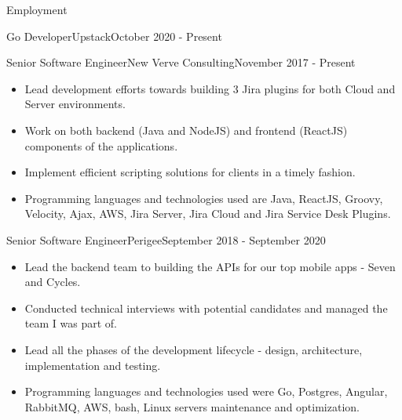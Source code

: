\documentclass[]{cv}
\begin{document}
	\makeheader
	
	\begin{cvsection}{Employment}
		\begin{cvsubsection}{Go Developer}{Upstack}{October 2020 - Present }
		\end{cvsubsection}

		\begin{cvsubsection}{Senior Software Engineer}{New Verve Consulting}{November 2017 - Present }
			\begin{itemize}
				\item Lead development efforts towards building 3 Jira plugins for both Cloud and Server environments.
				\item Work on both backend (Java and NodeJS) and frontend (ReactJS) components of the applications.
				\item Implement efficient scripting solutions for clients in a timely fashion.
				\item Programming languages and technologies used are Java, ReactJS, Groovy, Velocity, Ajax, AWS, 
				Jira Server, Jira Cloud and Jira Service Desk Plugins.
			\end{itemize}
		\end{cvsubsection}

		\begin{cvsubsection}{Senior Software Engineer}{Perigee}{September 2018 - September 2020}
			\begin{itemize}
				\item Lead the backend team to building the APIs for our top mobile apps - Seven and Cycles.
				\item Conducted technical interviews with potential candidates and managed the team I was part of.
				\item Lead all the phases of the development lifecycle - design, architecture, implementation and testing.
				\item Programming languages and technologies used were Go, Postgres, Angular, RabbitMQ, AWS, bash, Linux servers maintenance and optimization.
			\end{itemize}
		\end{cvsubsection}
		

\end{cvsection}
\end{document}
